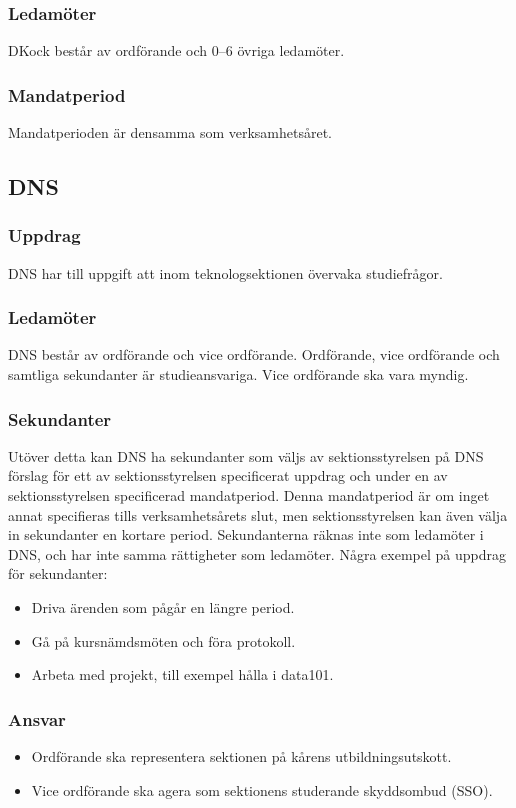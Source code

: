 \subsubsection{Ledamöter}
DKock består av ordförande och 0--6 övriga ledamöter. 
\subsubsection{Mandatperiod}
Mandatperioden är densamma som verksamhetsåret.

\subsection{DNS}
\subsubsection{Uppdrag}
DNS har till uppgift att inom teknologsektionen övervaka studiefrågor.
\subsubsection{Ledamöter}
DNS består av ordförande och vice ordförande. 
Ordförande, vice ordförande och samtliga sekundanter är studieansvariga.
Vice ordförande ska vara myndig.
\subsubsection{Sekundanter}
Utöver detta kan DNS ha sekundanter som väljs av sektionsstyrelsen på DNS förslag för ett av sektionsstyrelsen specificerat uppdrag och under en av sektionsstyrelsen specificerad mandatperiod.
Denna mandatperiod är om inget annat specifieras tills verksamhetsårets slut, men sektionsstyrelsen kan även välja in sekundanter en kortare period.
Sekundanterna räknas inte som ledamöter i DNS, och har inte samma rättigheter som ledamöter.
Några exempel på uppdrag för sekundanter:
\begin{itemize}
  \item Driva ärenden som pågår en längre period.
  \item Gå på kursnämdsmöten och föra protokoll.
  \item Arbeta med projekt, till exempel hålla i data101.
\end{itemize}
\subsubsection{Ansvar}
\begin{itemize}
  \item Ordförande ska representera sektionen på kårens utbildningsutskott.
  \item Vice ordförande ska agera som sektionens studerande skyddsombud (SSO).
\end{itemize}
